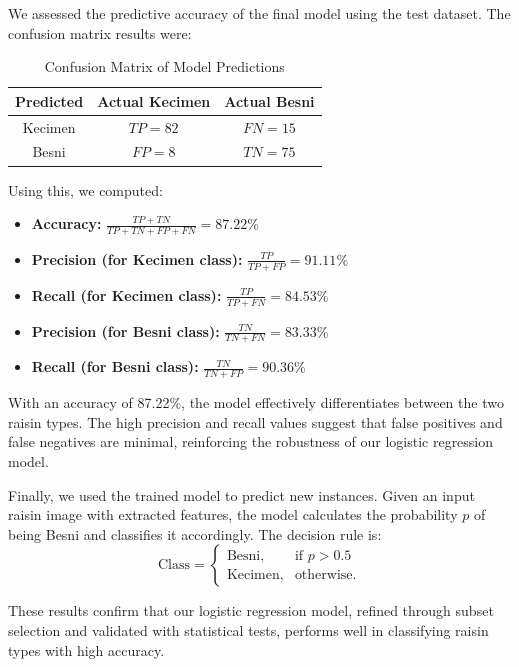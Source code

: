 \documentclass{article}
\begin{document}
We assessed the predictive accuracy of the final model using the test dataset. The confusion matrix results were:

\newpage

\begin{table}[h]
\centering
\begin{tabular}{c|c c}
\toprule
\textbf{Predicted} & \textbf{Actual Kecimen} & \textbf{Actual Besni} \\
\midrule
Kecimen & $TP = 82$ & $FN = 15$ \\
Besni & $FP = 8$ & $TN = 75$ \\
\bottomrule
\end{tabular}
\caption{Confusion Matrix of Model Predictions}
\label{tab:conf_matrix}
\end{table}

Using this, we computed:
\begin{itemize}
\item \textbf{Accuracy:} $\frac{TP + TN}{TP + TN + FP + FN} = 87.22\%$
\item \textbf{Precision (for Kecimen class):} $\frac{TP}{TP + FP} = 91.11\%$
\item \textbf{Recall (for Kecimen class):} $\frac{TP}{TP + FN} = 84.53\%$
\item \textbf{Precision (for Besni class):} $\frac{TN}{TN + FN} = 83.33\%$
\item \textbf{Recall (for Besni class):} $\frac{TN}{TN + FP} = 90.36\%$
\end{itemize}

With an accuracy of 87.22\%, the model effectively differentiates between the two raisin types. The high precision and recall values suggest that false positives and false negatives are minimal, reinforcing the robustness of our logistic regression model.

Finally, we used the trained model to predict new instances. Given an input raisin image with extracted features, the model calculates the probability $p$ of being Besni and classifies it accordingly. The decision rule is:
\begin{equation}
\text{Class} = \begin{cases}
\text{Besni}, & \text{if } p > 0.5 \\
\text{Kecimen}, & \text{otherwise.}
\end{cases}
\end{equation}

These results confirm that our logistic regression model, refined through subset selection and validated with statistical tests, performs well in classifying raisin types with high accuracy.
\end{document}
